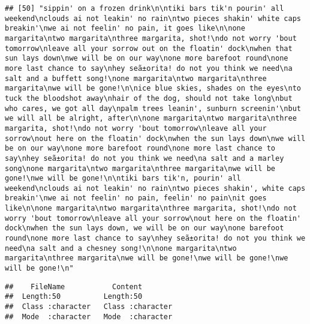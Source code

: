 \documentclass[]{article}
\begin{document}
\begin{verbatim}
## [50] "sippin' on a frozen drink\n\ntiki bars tik'n pourin' all weekend\nclouds ai not leakin' no rain\ntwo pieces shakin' white caps breakin'\nwe ai not feelin' no pain, it goes like\n\none margarita\ntwo margarita\nthree margarita, shot!\ndo not worry 'bout tomorrow\nleave all your sorrow out on the floatin' dock\nwhen that sun lays down\nwe will be on our way\none more barefoot round\none more last chance to say\nhey seã±orita! do not you think we need\na salt and a buffett song!\none margarita\ntwo margarita\nthree margarita\nwe will be gone!\n\nice blue skies, shades on the eyes\nto tuck the bloodshot away\nhair of the dog, should not take long\nbut who cares, we got all day\npalm trees leanin', sunburn screenin'\nbut we will all be alright, after\n\none margarita\ntwo margarita\nthree margarita, shot!\ndo not worry 'bout tomorrow\nleave all your sorrow\nout here on the floatin' dock\nwhen the sun lays down\nwe will be on our way\none more barefoot round\none more last chance to say\nhey seã±orita! do not you think we need\na salt and a marley song\none margarita\ntwo margarita\nthree margarita\nwe will be gone!\nwe will be gone!\n\ntiki bars tik'n, pourin' all weekend\nclouds ai not leakin' no rain\ntwo pieces shakin', white caps breakin'\nwe ai not feelin' no pain, feelin' no pain\nit goes like\n\none margarita\ntwo margarita\nthree margarita, shot!\ndo not worry 'bout tomorrow\nleave all your sorrow\nout here on the floatin' dock\nwhen the sun lays down, we will be on our way\none barefoot round\none more last chance to say\nhey seã±orita! do not you think we need\na salt and a chesney song!\n\none margarita\ntwo margarita\nthree margarita\nwe will be gone!\nwe will be gone!\nwe will be gone!\n"
\end{verbatim}

\begin{verbatim}
##    FileName           Content         
##  Length:50          Length:50         
##  Class :character   Class :character  
##  Mode  :character   Mode  :character
\end{verbatim}
\end{document}
